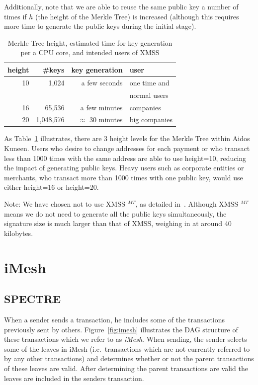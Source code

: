 \documentclass[a4paper,10pt,twocolumn]{article}
\begin{document}
Additionally, note that we are able to reuse the same public key a number of times if \(h\) (the height of the Merkle Tree) is increased (although this requires more time to generate the public keys during the initial stage).

\begin{table}[ht]
	\caption{Merkle Tree height, estimated time for key generation per a CPU core, and intended users of XMSS}
    \label{tbl:height}
	\begin{tabular}{rrrl} 
		\toprule
		height  & \#keys & key generation & user \\ 
		\midrule
			  10 & 1,024 &  a few seconds & one time and\\
			  & & & normal users \\
			  16 & 65,536 & a few minutes & companies\\
			  20 & 1,048,576 & \( \approx \) 30 minutes &  big companies\\ 
			  \bottomrule
			\end{tabular}
  \end{table}

As Table~\ref{tbl:height} illustrates, there are 3 height levels for the Merkle Tree within Aidos Kuneen. Users who desire to change 
addresses for each payment or who transact less than 1000 times with the same address are able to use height=10, reducing the impact of 
generating public keys. Heavy users such as corporate entities or merchants, who transact more than 1000 times with one 
public key, would use either height=16 or height=20.

Note: We have chosen not to use XMSS \(^{MT}\), as detailed in~\cite{ietf}. Although XMSS \(^{MT}\) means we do not need to generate all the public keys simultaneously, the signature size is much larger than that of XMSS, weighing in at around 40 kilobytes.

\section{iMesh}
\label{sec:imesh}

\subsection{SPECTRE}
When a sender sends a transaction, he includes some of the transactions previously sent by others. 
Figure~\ref{fig:imesh} illustrates the DAG structure of these transactions which we refer to as \emph{iMesh}. When sending,
the sender selects some of the leaves in iMesh (i.e.\ transactions which are not currently referred to by any other transactions) and 
determines whether or not the parent transactions of these leaves are valid. After determining the parent transactions are valid the 
leaves are included in the senders transaction.
\end{document}
